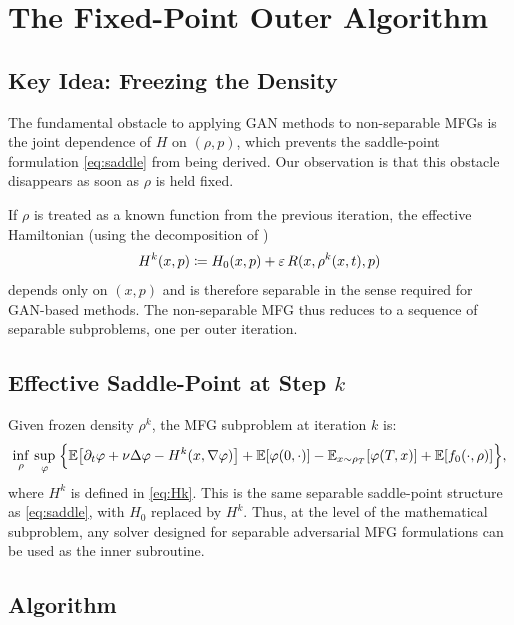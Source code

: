 \section{The Fixed-Point Outer Algorithm}
\label{sec:algorithm}

\subsection{Key Idea: Freezing the Density}

The fundamental obstacle to applying GAN methods to non-separable MFGs is
the joint dependence of $H$ on $(\rho, p)$, which prevents the saddle-point
formulation \eqref{eq:saddle} from being derived.
Our observation is that this obstacle disappears as soon as $\rho$ is held fixed.

If $\rho$ is treated as a known function from the previous iteration,
the effective Hamiltonian (using the decomposition of )
\begin{equation}\label{eq:Hk}
  H^k(x,p) \coloneqq H_0(x,p) + \varepsilon\, R(x,\rho^k(x,t),p)
\end{equation}
depends only on $(x,p)$ and is therefore separable in the sense required
for GAN-based methods. The non-separable MFG thus reduces to a sequence
of separable subproblems, one per outer iteration.

\subsection{Effective Saddle-Point at Step $k$}

Given frozen density $\rho^k$, the MFG subproblem at iteration $k$ is:
\begin{equation}\label{eq:saddle_k}
  \inf_{\rho}\, \sup_{\varphi}\;
  \Bigl\{
    \mathbb{E}\bigl[\partial_t\varphi + \nu\Delta\varphi - H^k(x,\nabla\varphi)\bigr]
    + \mathbb{E}[\varphi(0,\cdot)] - \mathbb{E}_{x\sim\rho_T}[\varphi(T,x)]
    + \mathbb{E}[f_0(\cdot,\rho)]
  \Bigr\},
\end{equation}
where $H^k$ is defined in \eqref{eq:Hk}. This is the same separable
saddle-point structure as \eqref{eq:saddle}, with $H_0$ replaced by
$H^k$. Thus, at the level of the mathematical subproblem, any solver
designed for separable adversarial MFG formulations can be used as the
inner subroutine.

\subsection{Algorithm}

